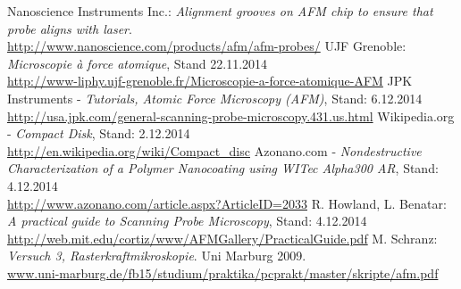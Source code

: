 \documentclass[a4paper, parskip=half, 12pt, bibliography=totocnumbered]{scrartcl}
\begin{document}





\begin{thebibliography}{10}
 Nanoscience Instruments Inc.: \emph{Alignment grooves on AFM chip to ensure that probe aligns with laser}.\\
\url{http://www.nanoscience.com/products/afm/afm-probes/}
 UJF Grenoble: \emph{Microscopie à force atomique}, Stand 22.11.2014\\
\url{http://www-liphy.ujf-grenoble.fr/Microscopie-a-force-atomique-AFM}
 JPK Instruments - \emph{Tutorials, Atomic Force Microscopy (AFM)}, Stand: 6.12.2014\\
\url{http://usa.jpk.com/general-scanning-probe-microscopy.431.us.html}
 Wikipedia.org - \emph{Compact Disk}, Stand: 2.12.2014\\
\url{http://en.wikipedia.org/wiki/Compact_disc}
 Azonano.com - \emph{Nondestructive Characterization of a Polymer Nanocoating using WITec Alpha300 AR}, Stand: 4.12.2014\\
\url{http://www.azonano.com/article.aspx?ArticleID=2033}
 R. Howland, L. Benatar: \emph{A practical guide to Scanning Probe Microscopy}, Stand: 4.12.2014\\
\url{http://web.mit.edu/cortiz/www/AFMGallery/PracticalGuide.pdf}
 M. Schranz: \emph{Versuch 3, Rasterkraftmikroskopie}. Uni Marburg 2009.\\
\mbox{\url{www.uni-marburg.de/fb15/studium/praktika/pcprakt/master/skripte/afm.pdf}}
\end{thebibliography}
\end{document}
